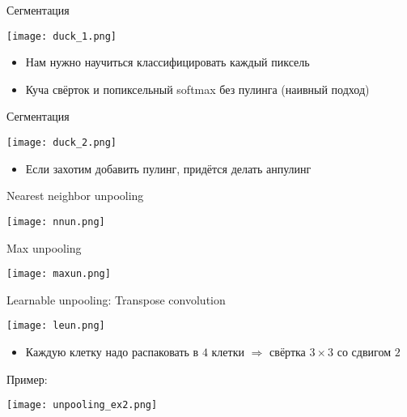 \documentclass[notes,12pt, aspectratio=169]{beamer}
\begin{document}
\begin{frame}{Сегментация}
	\begin{center}
		\texttt{[image: duck\_1.png]}
	\end{center}
	\begin{itemize}
		\item Нам нужно научиться классифицировать каждый пиксель
		\item Куча свёрток и попиксельный softmax без пулинга (наивный подход)
	\end{itemize}
\end{frame}


\begin{frame}{Сегментация}
	\begin{center}
		\texttt{[image: duck\_2.png]}
	\end{center}
	\begin{itemize}
		\item Если захотим добавить пулинг, придётся делать анпулинг
	\end{itemize}
\end{frame}


\begin{frame}{Nearest neighbor unpooling}
	\begin{center}
		\texttt{[image: nnun.png]}
	\end{center}
\end{frame}


\begin{frame}{Max unpooling}
	\begin{center}
		\texttt{[image: maxun.png]}
	\end{center}
\end{frame}


\begin{frame}{Learnable unpooling: Transpose convolution}
	\begin{center}
		\texttt{[image: leun.png]}
	\end{center}
	\begin{itemize}
		\item Каждую клетку надо распаковать в $4$ клетки $\Rightarrow$ свёртка $3 \times 3$ со сдвигом $2$
	\end{itemize}
\end{frame}


\begin{frame}{Пример:}
	\begin{center}
		\texttt{[image: unpooling\_ex2.png]}
	\end{center}
\end{frame}
\end{document}

